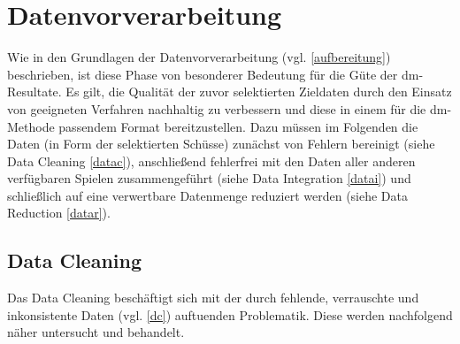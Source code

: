 \section{Datenvorverarbeitung}
\label{dv}
Wie in den Grundlagen der Datenvorverarbeitung (vgl. \vref{aufbereitung}) beschrieben, ist diese Phase von besonderer Bedeutung für die Güte der \gls{dm}-Resultate. Es gilt, die Qualität der zuvor selektierten Zieldaten durch den Einsatz von geeigneten Verfahren nachhaltig zu verbessern und diese in einem für die \gls{dm}-Methode passendem Format bereitzustellen. Dazu müssen im Folgenden die Daten (in Form der selektierten Schüsse) zunächst von Fehlern bereinigt (siehe Data Cleaning \vref{datac}), anschließend fehlerfrei mit den Daten aller anderen verfügbaren Spielen zusammengeführt (siehe Data Integration \vref{datai}) und schließlich auf eine verwertbare Datenmenge reduziert werden (siehe Data Reduction \vref{datar}).

\subsection{Data Cleaning}
\label{datac}
Das Data Cleaning beschäftigt sich mit der durch fehlende, verrauschte und inkonsistente Daten (vgl. \vref{dc}) auftuenden Problematik. Diese werden nachfolgend näher untersucht und behandelt. 

